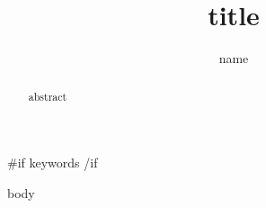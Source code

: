 \documentclass[sigconf,authordraft]{acmart}
\title{{{title}}}
{{conference_latex}}
{{year_latex}}
{{doi_latex}}
\author{{{name}}}
\affiliation{%
  \institution{{{affiliation}}}
  \country{{{country}}}
}
\begin{document}
\begin{abstract}
{{abstract}}
\end{abstract}

{{#if keywords}}
{{/if}}

\maketitle

{{body}}



\end{document}
